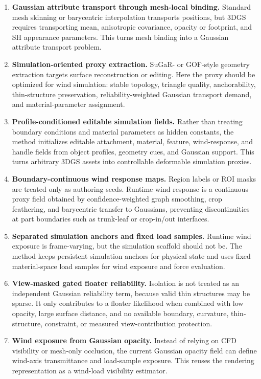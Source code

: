 \documentclass[11pt]{article}
\begin{document}
\begin{enumerate}
  \item \textbf{Gaussian attribute transport through mesh-local binding.}
  Standard mesh skinning or barycentric interpolation transports positions, but 3DGS requires transporting mean, anisotropic covariance, opacity or footprint, and SH appearance parameters. This turns mesh binding into a Gaussian attribute transport problem.
  \item \textbf{Simulation-oriented proxy extraction.}
  SuGaR- or GOF-style geometry extraction targets surface reconstruction or editing. Here the proxy should be optimized for wind simulation: stable topology, triangle quality, anchorability, thin-structure preservation, reliability-weighted Gaussian transport demand, and material-parameter assignment.
  \item \textbf{Profile-conditioned editable simulation fields.}
  Rather than treating boundary conditions and material parameters as hidden constants, the method initializes editable attachment, material, feature, wind-response, and handle fields from object profiles, geometry cues, and Gaussian support. This turns arbitrary 3DGS assets into controllable deformable simulation proxies.
  \item \textbf{Boundary-continuous wind response maps.}
  Region labels or ROI masks are treated only as authoring seeds. Runtime wind response is a continuous proxy field obtained by confidence-weighted graph smoothing, crop feathering, and barycentric transfer to Gaussians, preventing discontinuities at part boundaries such as trunk-leaf or crop-in/out interfaces.
  \item \textbf{Separated simulation anchors and fixed load samples.}
  Runtime wind exposure is frame-varying, but the simulation scaffold should not be. The method keeps persistent simulation anchors for physical state and uses fixed material-space load samples for wind exposure and force evaluation.
  \item \textbf{View-masked gated floater reliability.}
  Isolation is not treated as an independent Gaussian reliability term, because valid thin structures may be sparse. It only contributes to a floater likelihood when combined with low opacity, large surface distance, and no available boundary, curvature, thin-structure, constraint, or measured view-contribution protection.
  \item \textbf{Wind exposure from Gaussian opacity.}
  Instead of relying on CFD visibility or mesh-only occlusion, the current Gaussian opacity field can define wind-axis transmittance and load-sample exposure. This reuses the rendering representation as a wind-load visibility estimator.

\end{enumerate}
\end{document}
